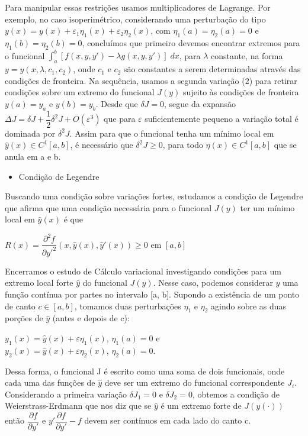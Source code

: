 \documentclass[12pt, a4paper]{article}
\begin{document}
Para manipular essas restrições usamos multiplicadores de Lagrange. Por exemplo, no caso isoperimétrico, considerando uma perturbação do tipo $y(x)=y(x)+ \varepsilon_1 \eta_1 (x)+ \varepsilon_2 \eta_2 (x)$, com $\eta_1(a)=\eta_2(a) = 0$ e $\eta_1(b)=\eta_2(b)= 0$, concluímos que primeiro devemos encontrar extremos para o funcional $\int_a^b[f(x,y,y') - \lambda g(x,y,y')]\; dx$, para $\lambda$ constante, na forma $y=y(x,\lambda,c_1,c_2)$, onde $c_1$  e  $c_2$ são constantes a serem determinadas através das condições de fronteira. Na sequência, usamos a segunda variação (2) para retirar condições sobre um extremo do funcional $J(y)$ sujeito às condições de fronteira $y(a)= y_a$ e $ y(b) = y_b$. Desde que $\delta J=0$, segue da expansão $\Delta J= \delta J+\dfrac{1}{2} \delta^2 J+O(\varepsilon^3)$ que para $\varepsilon$ suficientemente pequeno a variação total é dominada por $\delta^2 J$. Assim para que o funcional tenha um mínimo local em $\hat{y}(x) \in C^1 [a,b]$, é necessário que $\delta^2 J \ge 0$, para todo $\eta(x) \in C^1 [a,b]$ que se anula em a e b.

\begin{itemize}
\item Condição de Legendre
\end{itemize}

Buscando uma condição sobre variações fortes, estudamos a condição de Legendre que afirma que uma condição necessária para o funcional $J(y)$ ter um mínimo local em $\hat{y}(x)$ é que 

\begin{center}
$R(x) = \dfrac{\partial^2 f}{\partial y'^2}(x,\hat{y}(x),\hat{y}'(x)) \ge 0$ em  $[a,b]$
\end{center}

Encerramos o estudo de Cálculo variacional investigando condições para um extremo local forte $\hat{y}$ do funcional $J(y)$. Nesse caso, podemos considerar $\hat{y}$ uma função contínua por partes no intervalo [a, b]. Supondo a existência de um ponto de canto $c \in [a,b]$, tomamos duas perturbações $\eta_1$ e $\eta_2$ agindo sobre as duas porções de $\hat{y}$ (antes e depois de c):

\begin{center}
$y_1(x)=\hat{y}(x)+ \varepsilon \eta_1(x)$, $\eta_1(a)=0$ e\\
$y_2(x)=\hat{y}(x)+ \varepsilon \eta_2(x)$, $\eta_2(a)=0$.
\end{center}

Dessa forma, o funcional J é escrito como uma soma de dois funcionais, onde cada uma das funções de $\hat{y}$ deve ser um extremo do funcional correspondente $J_i$. Considerando a primeira variação $\delta J_1=0$ e $\delta J_2=0$, obtemos a condição de Weierstrass-Erdmann que nos diz que se $\hat{y}$ é um extremo forte de $J(y(\cdot))$ então  $\dfrac{\partial f}{\partial y'}$ e $y'\dfrac{\partial f}{\partial y'}-f$ devem ser contínuos em cada lado do canto c.
\end{document}
